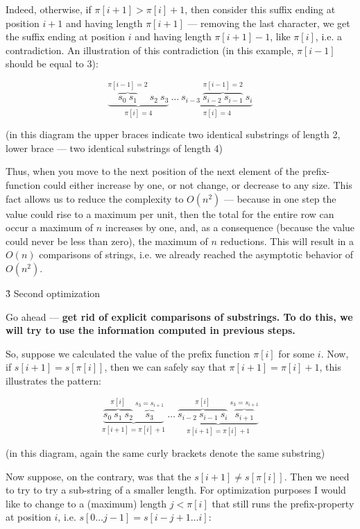 Indeed, otherwise, if $\pi[i+1] > \pi[i] + 1$, then consider this suffix ending at position $i+1$ and having length $\pi[i+1]$ --- removing the last character, we get the suffix ending at position $i$ and having length $\pi[i+1]-1$, like $\pi[i]$, i.e. a contradiction. An illustration of this contradiction (in this example, $\pi[i-1]$ should be equal to 3):

$$ \underbrace{ \overbrace{s_0 \ s_1}^{\pi[i-1]=2} \ s_2 \ s_3}_{\pi[i]=4} \ \ldots\ \underbrace{ s_{i-3}\ \overbrace{s_{i-2}\ s_{i-1}}^{\pi[i-1]=2} \ s_i}_{\pi[i]=4} $$

(in this diagram the upper braces indicate two identical substrings of length 2, lower brace --- two identical substrings of length 4)

Thus, when you move to the next position of the next element of the prefix-function could either increase by one, or not change, or decrease to any size. This fact allows us to reduce the complexity to $O(n^2)$ --- because in one step the value could rise to a maximum per unit, then the total for the entire row can occur a maximum of $n$ increases by one, and, as a consequence (because the value could never be less than zero), the maximum of $n$ reductions. This will result in a $O(n)$ comparisons of strings, i.e. we already reached the asymptotic behavior of $O(n^2)$.

\h3{ Second optimization }

Go ahead --- \bf{get rid of explicit comparisons of substrings}. To do this, we will try to use the information computed in previous steps.

So, suppose we calculated the value of the prefix function $\pi[i]$ for some $i$. Now, if $s[i+1] = s[\pi[i]]$, then we can safely say that $\pi[i+1] = \pi[i] + 1$, this illustrates the pattern:

$$ \underbrace{ \overbrace{s_0 \ s_1 \ s_2}^{\pi[i]} \ \overbrace{s_3}^{s_3=s_{i+1}}}_{\pi[i+1]=\pi[i]+1} \ \ldots\ \underbrace{ \overbrace{s_{i-2}\ s_{i-1}\ s_i}^{\pi[i]} \ \overbrace{s_{i+1}}^{s_3=s_{i+1}}}_{\pi[i+1]=\pi[i]+1} $$

(in this diagram, again the same curly brackets denote the same substring)

Now suppose, on the contrary, was that the $s[i+1] \ne s[\pi[i]]$. Then we need to try to try a sub-string of a smaller length. For optimization purposes I would like to change to a (maximum) length $j < \pi[i]$ that still runs the prefix-property at position $i$, i.e. $s[0 \ldots j-1] = s[i-j+1 \ldots i]$:

